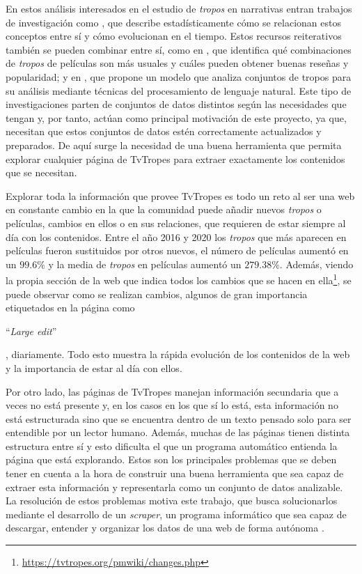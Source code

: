 En estos análisis interesados en el estudio de \textit{tropos} en narrativas
entran trabajos de investigación como \cite{garcia2020tropes}, que describe
estadísticamente cómo se relacionan estos conceptos entre sí y cómo evolucionan
en el tiempo. Estos recursos reiterativos también se pueden combinar entre sí,
como en \cite{garcia2021simpsons}, que identifica qué combinaciones de
\textit{tropos} de películas son más usuales y cuáles pueden obtener buenas
reseñas y popularidad; y en \cite{any2vec}, que propone un modelo que analiza
conjuntos de tropos para su análisis mediante técnicas del procesamiento de
lenguaje natural. Este tipo de investigaciones parten de conjuntos de datos
distintos según las necesidades que tengan y, por tanto, actúan como principal
motivación de este proyecto, ya que, necesitan que estos conjuntos de datos
estén correctamente actualizados y preparados. De aquí surge la necesidad de una
buena herramienta que permita explorar cualquier página de TvTropes para extraer
exactamente los contenidos que se necesitan.

Explorar toda la información que provee TvTropes es todo un reto al ser una web
en constante cambio en la que la comunidad puede añadir nuevos \textit{tropos} o
películas, cambios en ellos o en sus relaciones, que requieren de estar siempre
al día con los contenidos. Entre el año 2016 y 2020 los \textit{tropos} que más
aparecen en películas fueron sustituidos por otros nuevos, el número de
películas aumentó en un $99.6\%$ y la media de \textit{tropos} en películas
aumentó un $279.38\%$\cite{garcia2020tropes}. Además, viendo la propia sección
de la web que indica todos los cambios que se hacen en
ella\footnote{\url{https://tvtropes.org/pmwiki/changes.php}}, se puede observar
como se realizan cambios, algunos de gran importancia etiquetados en la página
como \begin{otherlanguage}{english}``\textit{Large edit}''\end{otherlanguage},
diariamente. Todo esto muestra la rápida evolución de los contenidos de la web y
la importancia de estar al día con ellos. 

Por otro lado, las páginas de TvTropes manejan información secundaria que a
veces no está presente y, en los casos en los que sí lo está, esta información
no está estructurada sino que se encuentra dentro de un texto pensado solo para
ser entendible por un lector humano. Además, muchas de las páginas tienen
distinta estructura entre sí y esto dificulta el que un programa automático
entienda la página que está explorando. Estos son los principales problemas que
se deben tener en cuenta a la hora de construir una buena herramienta que sea
capaz de extraer esta información y representarla como un conjunto de datos
analizable. La resolución de estos problemas motiva este trabajo, que busca
solucionarlos mediante el desarrollo de un \textit{scraper}, un programa
informático que sea capaz de descargar, entender y organizar los datos de una
web de forma autónoma \cite{apress2018scraping}.

